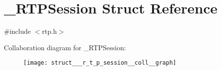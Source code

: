 \hypertarget{struct___r_t_p_session}{\section{\+\_\+\+R\+T\+P\+Session Struct Reference}
\label{struct___r_t_p_session}
}


{\ttfamily \#include $<$rtp.\+h$>$}



Collaboration diagram for \+\_\+\+R\+T\+P\+Session\+:\nopagebreak
\begin{figure}[H]
\begin{center}
\leavevmode
\texttt{[image: struct\_\_\_r\_t\_p\_session\_\_coll\_\_graph]}
\end{center}
\end{figure}

